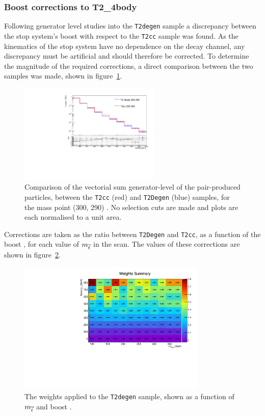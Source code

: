 \subsubsection{Boost corrections to T2\_4body}
Following generator level studies into the \texttt{T2degen} sample a discrepancy 
between the stop system's boost \Pt with respect to the \texttt{T2cc} sample was
found. As the kinematics of the stop system have no dependence on the 
decay channel, any discrepancy must be artificial and should 
therefore be corrected. To determine the magnitude of the required corrections, 
a direct comparison between the two samples was made, shown in
figure~\ref{fig:t2degen_boost_compare}.

\begin{figure}[h!]
  \centering
    \includegraphics[width=0.6\textwidth]{Figs/sms/t2degen/corrs/compar_stopGenPtVect_0_inc_inc_T2cc_noCuts_sitv_log.pdf}
  \caption{Comparison of the vectorial sum generator-level \Pt of the
  pair-produced \sTop particles, between the \texttt{T2cc} (red) and
  \texttt{T2Degen} (blue) 
  samples, for the mass point (300, 290) \gev. No selection cuts are made and 
  plots are each normalised to a unit area.}
  \label{fig:t2degen_boost_compare}
\end{figure}

Corrections are taken as the ratio between \texttt{T2Degen} and \texttt{T2cc},
as a function of the boost \Pt, for each value of $m_{\widetilde{t}}$ in the scan. The 
values of these corrections are shown in figure~\ref{fig:t2degen_boost_weights}.

\begin{figure}[ht!]
  \centering
    \includegraphics[width=0.8\textwidth]{Figs/sms/t2degen/corrs/stop_lut_weights.pdf}
  \caption{The weights applied to the \texttt{T2degen} sample, shown as a 
  function of $m_{\widetilde{t}}$ and boost \Pt.}
  \label{fig:t2degen_boost_weights}
\end{figure}

